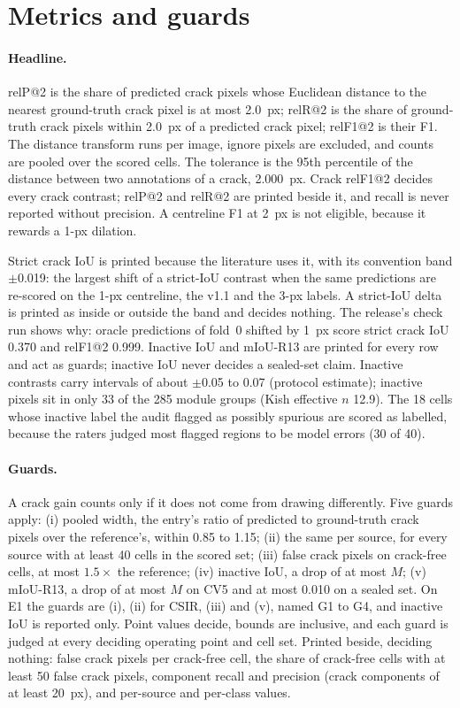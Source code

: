 \section{Metrics and guards}
\label{sec:protocol-metrics}

\paragraph{Headline.} relP@2 is the share of predicted crack pixels whose Euclidean distance to the nearest ground-truth crack pixel is
at most 2.0~px; relR@2 is the share of ground-truth crack pixels within 2.0~px of a predicted crack pixel; relF1@2 is their F1. The
distance transform runs per image, ignore pixels are excluded, and counts are pooled over the scored cells. The tolerance is the 95th
percentile of the distance between two annotations of a crack, 2.000~px. Crack relF1@2 decides every crack contrast; relP@2 and
relR@2 are printed beside it, and recall is never reported without precision. A centreline F1 at 2~px is not eligible, because it
rewards a 1-px dilation.

Strict crack IoU is printed because the literature uses it, with its convention band $\pm$0.019: the largest shift of a strict-IoU
contrast when the same predictions are re-scored on the 1-px centreline, the v1.1 and the 3-px labels. A strict-IoU delta is printed
as inside or outside the band and decides nothing. The release's check run shows why: oracle predictions of fold~0 shifted by 1~px
score strict crack IoU 0.370 and relF1@2 0.999. Inactive IoU and mIoU-R13 are printed for every row and act as guards; inactive IoU
never decides a sealed-set claim. Inactive contrasts carry intervals of about $\pm$0.05 to 0.07 (protocol estimate); inactive pixels sit in only 33 of the
285 module groups (Kish effective $n$ 12.9). The 18 cells whose inactive label the audit flagged as possibly spurious are scored as
labelled, because the raters judged most flagged regions to be model errors (30 of 40).

\paragraph{Guards.} A crack gain counts only if it does not come from drawing differently. Five guards apply: (i) pooled width, the
entry's ratio of predicted to ground-truth crack pixels over the reference's, within 0.85 to 1.15; (ii) the same per source, for every
source with at least 40 cells in the scored set; (iii) false crack pixels on crack-free cells, at most $1.5\times$ the reference;
(iv) inactive IoU, a drop of at most $M$; (v) mIoU-R13, a drop of at most $M$ on CV5 and at most 0.010 on a sealed set. On E1 the
guards are (i), (ii) for CSIR, (iii) and (v), named G1 to G4, and inactive IoU is reported only. Point values decide, bounds are inclusive, and each guard is judged at every deciding operating point and cell set. Printed beside, deciding
nothing: false crack pixels per crack-free cell, the share of crack-free cells with at least 50 false crack pixels, component recall
and precision (crack components of at least 20~px), and per-source and per-class values.

